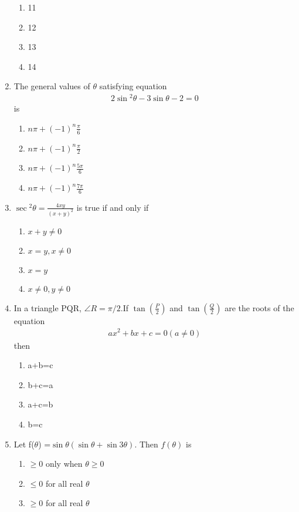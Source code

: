\begin{enumerate}[label=\arabic*.,ref=\thesubsection.\theenumi]
\begin{enumerate}
       \item 11
       \item 12
       \item 13
       \item 14
   \end{enumerate}
   \item The general values of $\theta$ satisfying equation 
   \begin{align}
       2\sin{^2\theta} - 3 \sin{\theta} -2 = 0
   \end{align} is 
   \begin{enumerate}
       \item $n\pi+(-1)^n\frac{\pi}{6}$
       \item $n\pi+(-1)^n\frac{\pi}{2}$
       \item $n\pi+(-1)^n\frac{5\pi}{6}$
       \item $n\pi+(-1)^n\frac{7\pi}{6}$
   \end{enumerate}
   \item $\sec{^2\theta} = \frac{4xy}{(x + y)^2}$ is true if and only if 
   \begin{enumerate}
       \item $x + y \neq 0$
       \item $x=y , x\neq 0$
       \item $x=y$
       \item $x\neq0, y\neq0$
   \end{enumerate}
   \item In a triangle PQR, $\angle{R} = \pi/2$.If $\tan({\frac{P}{2}})$ and $\tan{(\frac{Q}{2})}$ are the roots of the equation 
   \begin{align}
       ax^2 + bx + c = 0(a\neq 0)
   \end{align}
   then 
   \begin{enumerate}
       \item a+b=c
       \item b+c=a
       \item a+c=b
       \item b=c
   \end{enumerate}
   \item Let f($\theta$) =$\sin{\theta(\sin{\theta} +\sin{3\theta})}$. Then $f(\theta)$ is 
   \begin{enumerate}
       \item $\geq0$ only when $\theta\geq0$
       \item $\leq 0$ for all real $\theta$
       \item $\geq 0$ for all real $\theta$

\end{enumerate}
\end{enumerate}

